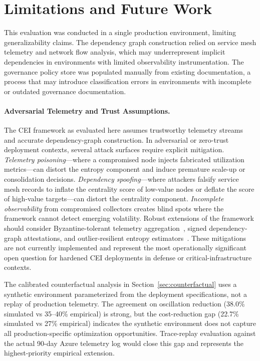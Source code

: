 \documentclass[runningheads]{llncs}
\begin{document}
\section{Limitations and Future Work}
\label{sec:limitations}

This evaluation was conducted in a single production environment, limiting generalizability claims. The dependency graph construction relied on service mesh telemetry and network flow analysis, which may underrepresent implicit dependencies in environments with limited observability instrumentation. The governance policy store was populated manually from existing documentation, a process that may introduce classification errors in environments with incomplete or outdated governance documentation.

\paragraph{Adversarial Telemetry and Trust Assumptions.}
The CEI framework as evaluated here assumes trustworthy telemetry streams and accurate dependency-graph construction. In adversarial or zero-trust deployment contexts, several attack surfaces require explicit mitigation. \emph{Telemetry poisoning}---where a compromised node injects fabricated utilization metrics---can distort the entropy component and induce premature scale-up or consolidation decisions. \emph{Dependency spoofing}---where attackers falsify service mesh records to inflate the centrality score of low-value nodes or deflate the score of high-value targets---can distort the centrality component. \emph{Incomplete observability} from compromised collectors creates blind spots where the framework cannot detect emerging volatility. Robust extensions of the framework should consider Byzantine-tolerant telemetry aggregation~\cite{byzantine_telemetry}, signed dependency-graph attestations, and outlier-resilient entropy estimators~\cite{robust_statistics_huber}. These mitigations are not currently implemented and represent the most operationally significant open question for hardened CEI deployments in defense or critical-infrastructure contexts.

The calibrated counterfactual analysis in Section~\ref{sec:counterfactual} uses a synthetic environment parameterized from the deployment specifications, not a replay of production telemetry. The agreement on oscillation reduction (38.0\% simulated vs 35--40\% empirical) is strong, but the cost-reduction gap (22.7\% simulated vs 27\% empirical) indicates the synthetic environment does not capture all production-specific optimization opportunities. Trace-replay evaluation against the actual 90-day Azure telemetry log would close this gap and represents the highest-priority empirical extension.
\end{document}
